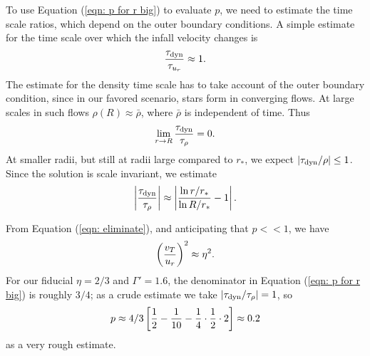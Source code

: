 \documentclass[iop,apj,numberedappendix]{emulateapj}
\newcommand       \be		{\begin{equation}}
\newcommand       \ee		{\end{equation}}
\newcommand       \etaeff       {\eta}
\newcommand       \tdyn         {\tau_{\rm dyn}}
\newcommand       \trho 	{{\tau_{\rho}}}
\newcommand       \tvr  	{{\tau_{u_r}}}
\begin{document}
To use Equation (\ref{eqn: p for r big}) to evaluate $p$, we need to
estimate the time scale ratios, which depend on the outer boundary
conditions. A simple estimate for the time scale over which the infall
velocity changes is
%
\be  %
{\tdyn\over\tvr}\approx 1.
\ee  %
%
The estimate for the density time scale has to take account of the
outer boundary condition, since in our favored scenario, stars form in
converging flows. At large scales in such flows
$\rho(R)\approx\bar\rho$, where $\bar\rho$ is independent of
time. Thus
% 
\be  %
\lim_{r\to R}{\tdyn\over\trho}=0.
\ee  %
%
At smaller radii, but still at radii large compared to $r_*$,
we expect 
$|\tdyn/\rho|\leq 1$.
% 
Since the solution is scale invariant, we estimate
%
\be  %
\left|{\tdyn\over \trho}\right|\approx
\left|{\ln r/r_*\over\ln R/r_*} - 1 \right|.
\ee  %
%

From Equation (\ref{eqn: eliminate}), and anticipating that $p<<1$, we have
%
\be  %
\left({v_T\over u_r}\right)^2\approx \etaeff^2.
\ee  %
%
For our fiducial $\etaeff=2/3$ and $\Gamma'=1.6$, the denominator in Equation (\ref{eqn:
  p for r big}) is roughly $3/4$; as a crude estimate we take
$|\tdyn/\tau_\rho|=1$, so 
%
\be  %
p\approx4/3\left[{1\over 2}-{1\over10}-{1\over4}\cdot{1\over 2}\cdot2\right]\approx0.2
\ee  %
%
as a very rough estimate.


%

\end{document}
